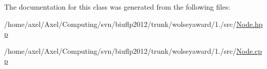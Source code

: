 \-The documentation for this class was generated from the following files\-:\begin{DoxyCompactItemize}
\item 
/home/axel/\-Axel/\-Computing/svn/biuflp2012/trunk/wolseyaward/1./src/\hyperlink{Node_8hpp}{\-Node.\-hpp}\item 
/home/axel/\-Axel/\-Computing/svn/biuflp2012/trunk/wolseyaward/1./src/\hyperlink{Node_8cpp}{\-Node.\-cpp}\end{DoxyCompactItemize}
